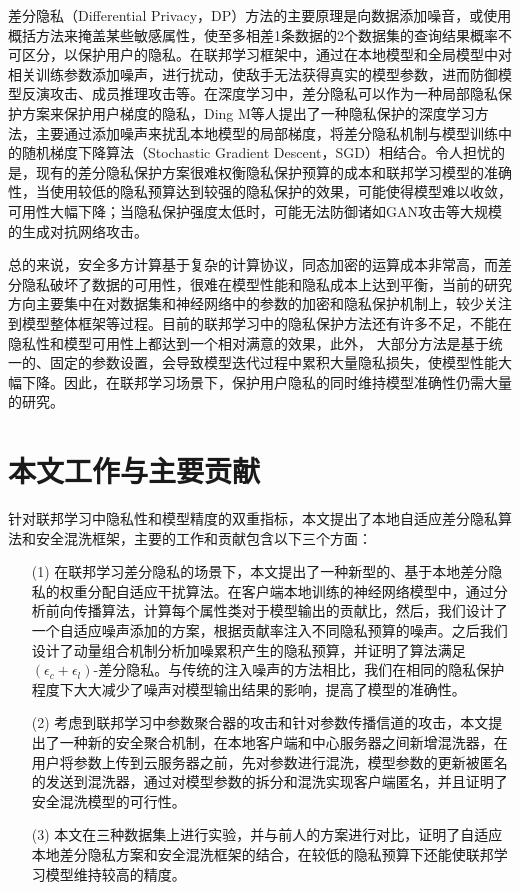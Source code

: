 差分隐私（Differential Privacy，DP）方法的主要原理是向数据添加噪音，或使用概括方法来掩盖某些敏感属性，使至多相差1条数据的2个数据集的查询结果概率不可区分，以保护用户的隐私。在联邦学习框架中，通过在本地模型和全局模型中对相关训练参数添加噪声，进行扰动，使敌手无法获得真实的模型参数，进而防御模型反演攻击、成员推理攻击等。在深度学习中，差分隐私可以作为一种局部隐私保护方案来保护用户梯度的隐私，Ding M等人提出了一种隐私保护的深度学习方法，主要通过添加噪声来扰乱本地模型的局部梯度，将差分隐私机制与模型训练中的随机梯度下降算法（Stochastic Gradient Descent，SGD）相结合。令人担忧的是，现有的差分隐私保护方案很难权衡隐私保护预算的成本和联邦学习模型的准确性，当使用较低的隐私预算达到较强的隐私保护的效果，可能使得模型难以收敛，可用性大幅下降；当隐私保护强度太低时，可能无法防御诸如GAN攻击等大规模的生成对抗网络攻击。

总的来说，安全多方计算基于复杂的计算协议，同态加密的运算成本非常高，而差分隐私破坏了数据的可用性，很难在模型性能和隐私成本上达到平衡，当前的研究方向主要集中在对数据集和神经网络中的参数的加密和隐私保护机制上，较少关注到模型整体框架等过程。目前的联邦学习中的隐私保护方法还有许多不足，不能在隐私性和模型可用性上都达到一个相对满意的效果，此外， 大部分方法是基于统一的、固定的参数设置，会导致模型迭代过程中累积大量隐私损失，使模型性能大幅下降。因此，在联邦学习场景下，保护用户隐私的同时维持模型准确性仍需大量的研究。

\section{本文工作与主要贡献}
针对联邦学习中隐私性和模型精度的双重指标，本文提出了本地自适应差分隐私算法和安全混洗框架，主要的工作和贡献包含以下三个方面：
\begin{enumerate}
\item [(1)] 在联邦学习差分隐私的场景下，本文提出了一种新型的、基于本地差分隐私的权重分配自适应干扰算法。在客户端本地训练的神经网络模型中，通过分析前向传播算法，计算每个属性类对于模型输出的贡献比，然后，我们设计了一个自适应噪声添加的方案，根据贡献率注入不同隐私预算的噪声。之后我们设计了动量组合机制分析加噪累积产生的隐私预算，并证明了算法满足$\left(\epsilon_{c}+\epsilon_{l}\right)$-差分隐私。与传统的注入噪声的方法相比，我们在相同的隐私保护程度下大大减少了噪声对模型输出结果的影响，提高了模型的准确性。
\item [(2)] 考虑到联邦学习中参数聚合器的攻击和针对参数传播信道的攻击，本文提出了一种新的安全聚合机制，在本地客户端和中心服务器之间新增混洗器，在用户将参数上传到云服务器之前，先对参数进行混洗，模型参数的更新被匿名的发送到混洗器，通过对模型参数的拆分和混洗实现客户端匿名，并且证明了安全混洗模型的可行性。
\item [(3)] 本文在三种数据集上进行实验，并与前人的方案进行对比，证明了自适应本地差分隐私方案和安全混洗框架的结合，在较低的隐私预算下还能使联邦学习模型维持较高的精度。
\end{enumerate}

